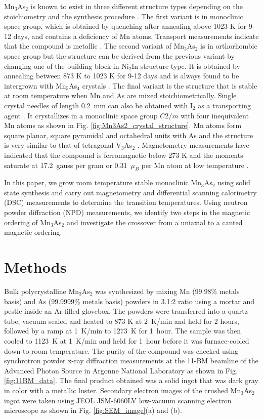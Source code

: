 \documentclass[letterpaper,10pt,doublespacing,edeposit]{uiucthesis2020}
\begin{document}
\begin{mainmatter}
Mn$_3$As$_2$ is known to exist in three different structure types depending on the stoichiometry and the synthesis procedure \cite{Dietrich1990,Moller1993,Hagedorn1994}. The first variant is in monoclinic space group, which is obtained by quenching after annealing above 1023 K for 9-12 days, and contains a deficiency of Mn atoms. Transport measurements indicate that the compound is metallic \cite{Dietrich1990}. The second variant of Mn$_3$As$_2$ is in orthorhombic space group but the structure can be derived from the previous variant by changing one of the building block in Ni$_2$In structure type.
It is obtained by annealing between 873 K to 1023 K for 9-12 days and is always found to be intergrown with Mn$_5$As$_4$ crystals \cite{Moller1993}. The final variant is the structure that is stable at room temperature when Mn and As are mixed stoichiometrically. 
Single crystal needles of length 0.2~mm can also be obtained with I$_2$ as a transporting agent \cite{Hagedorn1994}.
It crystallizes in a monoclinic space group $C2/m$ with four inequivalent Mn atoms as shown in Fig. \ref{fig:Mn3As2_crystal_structure}. Mn atoms form square planar, square pyramidal and octahedral units with As and the structure is very similar to that of tetragonal V$_3$As$_2$ \cite{Hagedorn1994,Hagedorn1995}. Magnetometry measurements have indicated that the compound is ferromagnetic below 273 K and the moments saturate at 17.2~gauss per gram or 0.31~$\mu_B$ per Mn atom at low temperature \cite{Yuzuri1960}. 


In this paper, we grow room temperature stable monoclinic Mn$_3$As$_2$ using solid state synthesis and carry out magnetometry and differential scanning calorimetry (DSC) measurements to determine the transition temperatures. Using neutron powder diffraction (NPD) measurements, we identify two steps in the magnetic ordering of Mn$_3$As$_2$ and  investigate the crossover from a uniaxial to a canted magnetic  ordering.





\section{Methods}


Bulk polycrystalline Mn$_3$As$_2$ was synthesized by mixing Mn (99.98\% metals basis) and As (99.9999\% metals basis) powders in 3.1:2 ratio using a mortar and pestle inside an Ar filled glovebox. The powders were transferred into a quartz tube, vacuum sealed and heated to 873 K at 2~K/min and held for 2 hours, followed by a ramp at 1~K/min to 1273~K for 1~hour. The sample was then cooled to 1123~K at 1~K/min and held for 1~hour before it was furnace-cooled down to room temperature. The purity of the compound was checked using synchrotron powder x-ray diffraction measurements at the 11-BM beamline of the Advanced Photon Source in Argonne National Laboratory as shown in Fig. \ref{fig:11BM_data}. The final product obtained was a solid ingot that was dark gray in color with a metallic luster. Secondary electron images of the crushed Mn$_3$As$_2$ ingot were taken using JEOL JSM-6060LV low-vacuum scanning electron microscope as shown in Fig. \ref{fig:SEM_image}(a) and (b).


\end{mainmatter}
\end{document}
